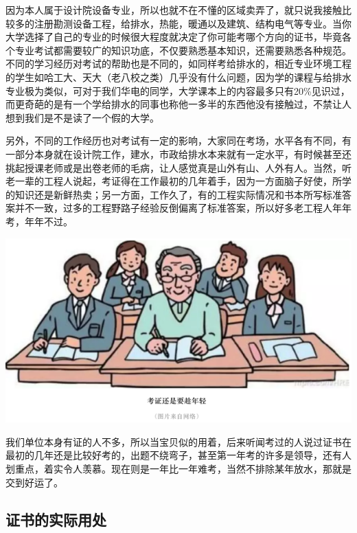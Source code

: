 \documentclass[]{book}
\begin{document}
因为本人属于设计院设备专业，所以也就不在不懂的区域卖弄了，就只说我接触比较多的注册勘测设备工程，给排水，热能，暖通以及建筑、结构电气等专业。当你大学选择了自己的专业的时候很大程度就决定了你可能考哪个方向的证书，毕竟各个专业考试都需要较广的知识功底，不仅要熟悉基本知识，还需要熟悉各种规范。不同的学习经历对考试的帮助也是不同的，如同样考给排水的，相近专业环境工程的学生如哈工大、天大（老八校之类）几乎没有什么问题，因为学的课程与给排水专业极为类似，可对于我们华电的同学，大学课本上的内容最多只有20\%见识过，而更奇葩的是有一个学给排水的同事也称他一多半的东西他没有接触过，不禁让人想到我们是不是读了一个假的大学。

另外，不同的工作经历也对考试有一定的影响，大家同在考场，水平各有不同，有一部分本身就在设计院工作，建水，市政给排水本来就有一定水平，有时候甚至还挑起授课老师或是出卷老师的毛病，让人感觉真是山外有山、人外有人。当然，听老一辈的工程人说起，考证得在工作最初的几年着手，因为一方面脑子好使，所学的知识还是新鲜热卖；另一方面，工作久了，有的工程实际情况和书本所写标准答案并不一致，过多的工程野路子经验反倒偏离了标准答案，所以好多老工程人年年考，年年不过。

\includegraphics[width=8.33in]{images/kaozheng4}

我们单位本身有证的人不多，所以当宝贝似的用着，后来听闻考过的人说过证书在最初的几年还是比较好考的，出题不绕弯子，甚至第一年考的许多是领导，还有人划重点，着实令人羡慕。现在则是一年比一年难考，当然不排除某年放水，那就是交到好运了。

\hypertarget{ux8bc1ux4e66ux7684ux5b9eux9645ux7528ux5904}{%
\subsection{证书的实际用处}\label{ux8bc1ux4e66ux7684ux5b9eux9645ux7528ux5904}}
\end{document}
